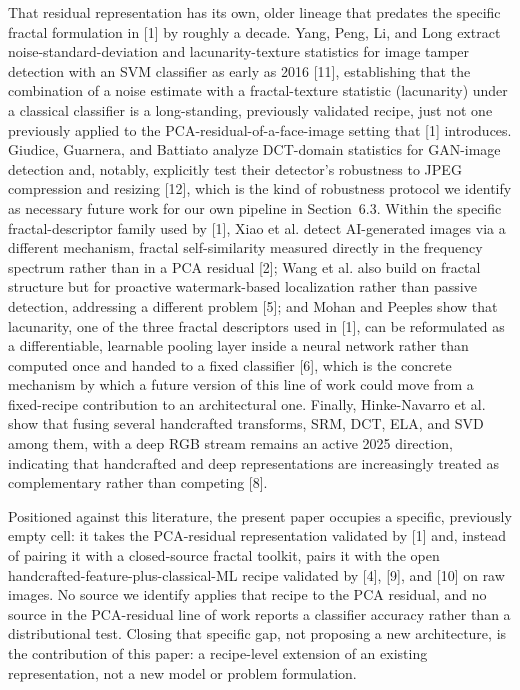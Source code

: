 \documentclass[11pt]{article}
\begin{document}
That residual representation has its own, older lineage that predates the specific fractal formulation in [1] by roughly a decade. Yang, Peng, Li, and Long extract noise-standard-deviation and lacunarity-texture statistics for image tamper detection with an SVM classifier as early as 2016 [11], establishing that the combination of a noise estimate with a fractal-texture statistic (lacunarity) under a classical classifier is a long-standing, previously validated recipe, just not one previously applied to the PCA-residual-of-a-face-image setting that [1] introduces. Giudice, Guarnera, and Battiato analyze DCT-domain statistics for GAN-image detection and, notably, explicitly test their detector's robustness to JPEG compression and resizing [12], which is the kind of robustness protocol we identify as necessary future work for our own pipeline in Section~6.3. Within the specific fractal-descriptor family used by [1], Xiao et al. detect AI-generated images via a different mechanism, fractal self-similarity measured directly in the frequency spectrum rather than in a PCA residual [2]; Wang et al. also build on fractal structure but for proactive watermark-based localization rather than passive detection, addressing a different problem [5]; and Mohan and Peeples show that lacunarity, one of the three fractal descriptors used in [1], can be reformulated as a differentiable, learnable pooling layer inside a neural network rather than computed once and handed to a fixed classifier [6], which is the concrete mechanism by which a future version of this line of work could move from a fixed-recipe contribution to an architectural one. Finally, Hinke-Navarro et al. show that fusing several handcrafted transforms, SRM, DCT, ELA, and SVD among them, with a deep RGB stream remains an active 2025 direction, indicating that handcrafted and deep representations are increasingly treated as complementary rather than competing [8].

Positioned against this literature, the present paper occupies a specific, previously empty cell: it takes the PCA-residual representation validated by [1] and, instead of pairing it with a closed-source fractal toolkit, pairs it with the open handcrafted-feature-plus-classical-ML recipe validated by [4], [9], and [10] on raw images. No source we identify applies that recipe to the PCA residual, and no source in the PCA-residual line of work reports a classifier accuracy rather than a distributional test. Closing that specific gap, not proposing a new architecture, is the contribution of this paper: a recipe-level extension of an existing representation, not a new model or problem formulation.
\end{document}
